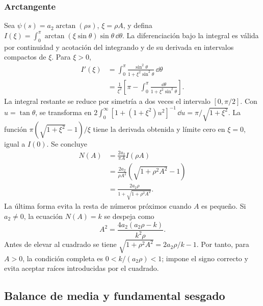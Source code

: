\subsubsection{Arctangente}
Sea \(\psi(s)=a_2\arctan(\rho s)\), \(\xi=\rho A\), y defina
\(I(\xi)=\int_0^\pi\arctan(\xi\sin\theta)\sin\theta\,\dd\theta\).
La diferenciación bajo la integral es válida por continuidad y acotación
del integrando y de su derivada en intervalos compactos de \(\xi\).
Para \(\xi>0\),
\begin{equation}
 \begin{aligned}
 I'(\xi)&=\int_0^\pi
 \frac{\sin^2\theta}{1+\xi^2\sin^2\theta}\,\dd\theta\\
 &=\frac1{\xi^2}\left[\pi-
 \int_0^\pi\frac{\dd\theta}{1+\xi^2\sin^2\theta}\right].
 \end{aligned}
 \label{bre:bal:arctan-integral}
\end{equation}
La integral restante se reduce por simetría a dos veces el intervalo
\([0,\pi/2]\). Con \(u=\tan\theta\), se transforma en
\(2\int_0^\infty[1+(1+\xi^2)u^2]^{-1}\,\dd u
=\pi/\sqrt{1+\xi^2}\). La función
\(\pi(\sqrt{1+\xi^2}-1)/\xi\) tiene la derivada obtenida y límite
cero en \(\xi=0\), igual a \(I(0)\). Se concluye
\begin{equation}
 \begin{aligned}
 N(A)&=\frac{2a_2}{\pi A}I(\rho A)\\
 &=\frac{2a_2}{\rho A^2}
       \left(\sqrt{1+\rho^2A^2}-1\right)\\
 &=\frac{2a_2\rho}{1+\sqrt{1+\rho^2A^2}}.
 \end{aligned}
 \label{bre:bal:arctan-df}
\end{equation}
La última forma evita la resta de números próximos cuando \(A\) es
pequeño. Si \(a_2\ne0\), la ecuación \(N(A)=k\) se despeja como
\begin{equation}
 A^2=\frac{4a_2(a_2\rho-k)}{k^2\rho}.
 \label{bre:bal:arctan-amplitude}
\end{equation}
Antes de elevar al cuadrado se tiene
\(\sqrt{1+\rho^2A^2}=2a_2\rho/k-1\). Por tanto, para \(A>0\),
la condición completa es \(0<k/(a_2\rho)<1\); impone el signo
correcto y evita aceptar raíces introducidas por el cuadrado.

\subsection{Balance de media y fundamental sesgado}
\label{bre:bal:bias}

